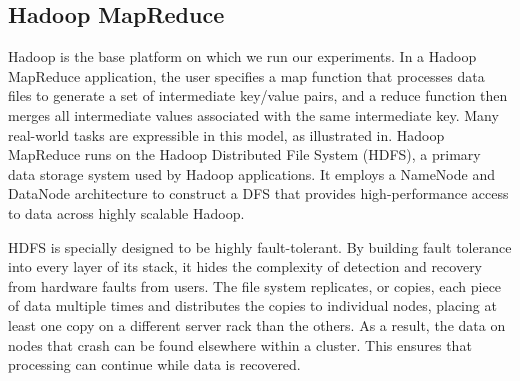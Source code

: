 \documentclass[11pt,twocolumn]{article}
\begin{document}
\subsection*{Hadoop MapReduce}
Hadoop is the base platform on which we run our experiments. In a Hadoop MapReduce application, the user specifies a map function that processes data files to generate a set of intermediate key/value pairs, and a reduce function then merges all intermediate values associated with the same intermediate key. Many real-world tasks are expressible in this model, as illustrated in\cite{62}. Hadoop MapReduce runs on the Hadoop Distributed File System (HDFS), a primary data storage system used by Hadoop applications. It employs a NameNode and DataNode architecture to construct a DFS that provides high-performance access to data across highly scalable Hadoop.\par

HDFS is specially designed to be highly fault-tolerant. By building fault tolerance into every layer of its stack, it hides the complexity of detection and recovery from hardware faults from users\cite{vavilapalli2013apache}. The file system replicates, or copies, each piece of data multiple times and distributes the copies to individual nodes, placing at least one copy on a different server rack than the others. As a result, the data on nodes that crash can be found elsewhere within a cluster. This ensures that processing can continue while data is recovered.\par
\end{document}
